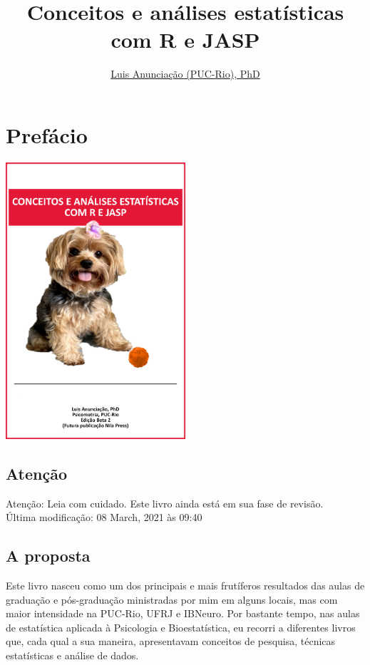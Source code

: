 \documentclass[
]{book}
\title{Conceitos e análises estatísticas com R e JASP}
\author{\href{mailto:\%20luisfca@puc-rio.br}{Luis Anunciação (PUC-Rio), PhD}}
\date{}
\begin{document}
\maketitle

{
\setcounter{tocdepth}{1}
\tableofcontents
}
\hypertarget{prefuxe1cio}{%
\chapter{Prefácio}\label{prefuxe1cio}}

\includegraphics[width=0.5\textwidth,height=\textheight]{./img/capa_jolie.png}

\hypertarget{atenuxe7uxe3o}{%
\section{Atenção}\label{atenuxe7uxe3o}}

Atenção: Leia com cuidado. Este livro ainda está em sua fase de revisão.\\
Última modificação: 08 March, 2021 às 09:40

\hypertarget{a-proposta}{%
\section{A proposta}\label{a-proposta}}

Este livro nasceu como um dos principais e mais frutíferos resultados das aulas de graduação e pós-graduação ministradas por mim em alguns locais, mas com maior intensidade na PUC-Rio, UFRJ e IBNeuro. Por bastante tempo, nas aulas de estatística aplicada à Psicologia e Bioestatística, eu recorri a diferentes livros que, cada qual a sua maneira, apresentavam conceitos de pesquisa, técnicas estatísticas e análise de dados.
\end{document}
